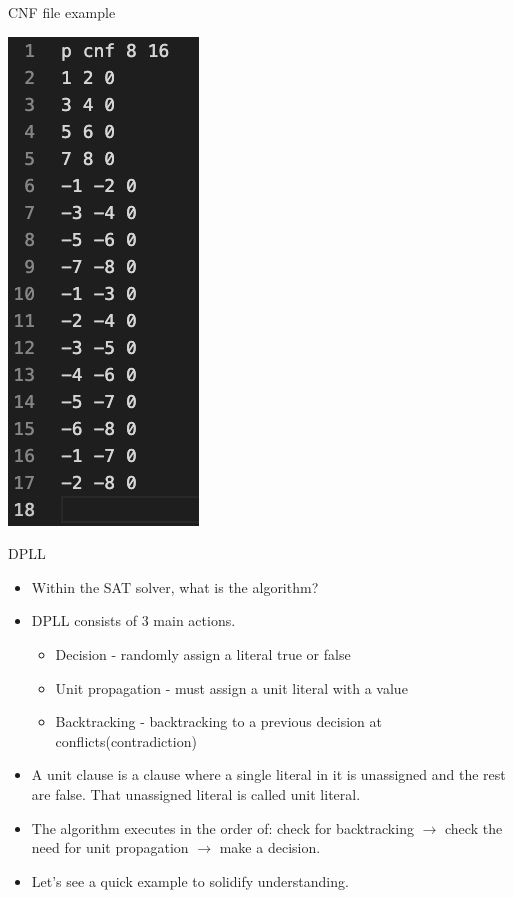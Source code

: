 \documentclass{beamer}
\begin{document}
\begin{frame}{CNF file example}

	\includegraphics[scale=0.4]{cnf_example}

\end{frame}


\begin{frame}[t]{DPLL}

	\begin{itemize}
		\item Within the SAT solver, what is the algorithm?
		\item DPLL consists of 3 main actions.
		\begin{itemize}
			\item Decision - randomly assign a literal true or false
			\item Unit propagation - must assign a unit literal with a value
			\item Backtracking - backtracking to a previous decision at conflicts(contradiction)
		\end{itemize}
		\item A unit clause is a clause where a single literal in it is unassigned and the rest are false. That unassigned literal is called unit literal.
		\item The algorithm executes in the order of: check for backtracking $\to$ check the need for unit propagation $\to$ make a decision.
		\item Let's see a quick example to solidify understanding. 
	\end{itemize}

\end{frame}
\end{document}
